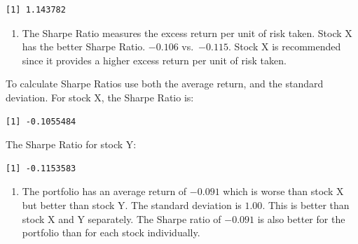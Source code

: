 \documentclass[
  letterpaper,
  DIV=11,
  numbers=noendperiod]{scrreprt}
\newenvironment{Shaded}{\begin{snugshade}}{\end{snugshade}}
\newcommand{\FloatTok}[1]{\textcolor[rgb]{0.68,0.00,0.00}{#1}}
\newcommand{\FunctionTok}[1]{\textcolor[rgb]{0.28,0.35,0.67}{#1}}
\newcommand{\NormalTok}[1]{\textcolor[rgb]{0.00,0.23,0.31}{#1}}
\newcommand{\SpecialCharTok}[1]{\textcolor[rgb]{0.37,0.37,0.37}{#1}}
\providecommand{\tightlist}{%
  \setlength{\itemsep}{0pt}\setlength{\parskip}{0pt}}\usepackage{longtable,booktabs,array}
\begin{document}
\begin{verbatim}
[1] 1.143782
\end{verbatim}

\begin{enumerate}
\def\labelenumi{\arabic{enumi}.}
\setcounter{enumi}{1}
\tightlist
\item
  The Sharpe Ratio measures the excess return per unit of risk taken.
  Stock X has the better Sharpe Ratio. \(-0.106\) vs.~\(-0.115\). Stock
  X is recommended since it provides a higher excess return per unit of
  risk taken.
\end{enumerate}

To calculate Sharpe Ratios use both the average return, and the standard
deviation. For stock X, the Sharpe Ratio is:

\begin{Shaded}
\end{Shaded}

\begin{verbatim}
[1] -0.1055484
\end{verbatim}

The Sharpe Ratio for stock Y:

\begin{Shaded}
\end{Shaded}

\begin{verbatim}
[1] -0.1153583
\end{verbatim}

\begin{enumerate}
\def\labelenumi{\arabic{enumi}.}
\setcounter{enumi}{2}
\tightlist
\item
  The portfolio has an average return of \(-0.091\) which is worse than
  stock X but better than stock Y. The standard deviation is \(1.00\).
  This is better than stock X and Y separately. The Sharpe ratio of
  \(-0.091\) is also better for the portfolio than for each stock
  individually.
\end{enumerate}
\end{document}
